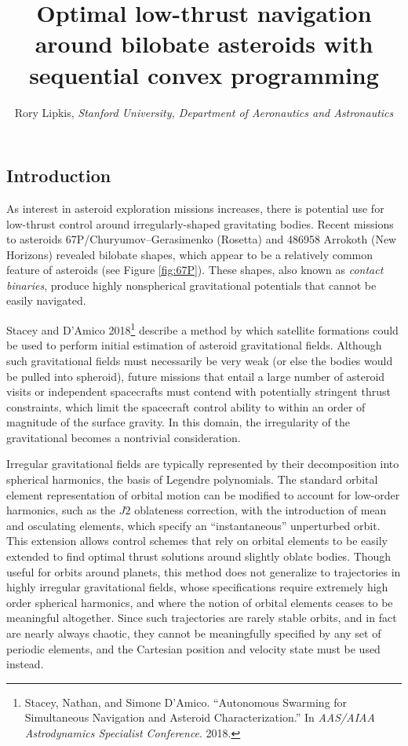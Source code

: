 \documentclass{article}
\title{\textbf{Optimal low-thrust navigation around bilobate asteroids with sequential convex programming}}
\author{Rory Lipkis, \textit{Stanford University, Department of Aeronautics and Astronautics}}
\date{}
\begin{document}
\maketitle

\begin{multicols}{2}
\section*{Introduction}
As interest in asteroid exploration missions increases, there is potential use for low-thrust control around irregularly-shaped gravitating bodies. Recent missions to asteroids 67P/Churyumov–Gerasimenko (Rosetta) and 486958 Arrokoth (New Horizons) revealed bilobate shapes, which appear to be a relatively common feature of asteroids (see Figure \ref{fig:67P}). These shapes, also known as \textit{contact binaries}, produce highly nonspherical gravitational potentials that cannot be easily navigated. 

Stacey and D'Amico 2018\footnote{Stacey, Nathan, and Simone D’Amico. ``Autonomous Swarming for Simultaneous Navigation and Asteroid Characterization.'' In \emph{AAS/AIAA Astrodynamics Specialist Conference}. 2018.} describe a method by which satellite formations could be used to perform initial estimation of asteroid gravitational fields. Although such gravitational fields must necessarily be very weak (or else the bodies would be pulled into spheroid), future missions that entail a large number of asteroid visits or independent spacecrafts must contend with potentially stringent thrust constraints, which limit the spacecraft control ability to within an order of magnitude of the surface gravity. In this domain, the irregularity of the gravitational becomes a nontrivial consideration.

Irregular gravitational fields are typically represented by their decomposition into spherical harmonics, the basis of Legendre polynomials. The standard orbital element representation of orbital motion can be modified to account for low-order harmonics, such as the $J2$ oblateness correction, with the introduction of mean and osculating elements, which specify an ``instantaneous'' unperturbed orbit. This extension allows control schemes that rely on orbital elements to be easily extended to find optimal thrust solutions around slightly oblate bodies. Though useful for orbits around planets, this method does not generalize to trajectories in highly irregular gravitational fields, whose specifications require extremely high order spherical harmonics, and where the notion of orbital elements ceases to be meaningful altogether. Since such trajectories are rarely stable orbits, and in fact are nearly always chaotic, they cannot be meaningfully specified by any set of periodic elements, and the Cartesian position and velocity state must be used instead.


\end{multicols}
\end{document}
